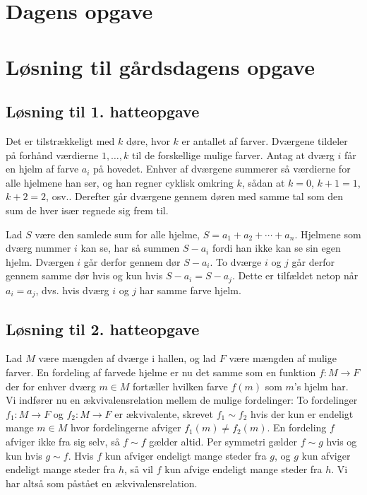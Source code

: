 \begin{minipage}[t]{100mm}
\vspace{3mm}
\section*{Dagens opgave}

\section*{Løsning til gårdsdagens opgave}
\subsection*{Løsning til 1. hatteopgave}
Det er tilstrækkeligt med $k$ døre, hvor $k$ er antallet af farver. Dværgene tildeler på forhånd værdierne $1,\dotsc,k$ til de forskellige mulige farver. Antag at dværg $i$ får en hjelm af farve $a_i$ på hovedet. Enhver af dværgene summerer så værdierne for alle hjelmene han ser, og han regner cyklisk omkring $k$, sådan at $k=0$, $k+1=1$, $k+2=2$, osv.. Derefter går dværgene gennem døren med samme tal som den sum de hver især regnede sig frem til.

Lad $S$ være den samlede sum for alle hjelme, $S=a_1+a_2+\dotsb+a_n$. Hjelmene som dværg nummer $i$ kan se, har så summen $S-a_i$ fordi han ikke kan se sin egen hjelm. Dværgen $i$ går derfor gennem dør $S-a_i$. To dværge $i$ og $j$ går derfor gennem samme dør hvis og kun hvis $S-a_i=S-a_j$. Dette er tilfældet netop når $a_i=a_j$, dvs. hvis dværg $i$ og $j$ har samme farve hjelm.

\subsection*{Løsning til 2. hatteopgave}
Lad $M$ være mængden af dværge i hallen, og lad $F$ være mængden af mulige farver. En fordeling af farvede hjelme er nu det samme som en funktion $f\colon M\to F$ der for enhver dværg $m\in M$ fortæller hvilken farve $f(m)$ som $m$'s hjelm har. Vi indfører nu en ækvivalensrelation mellem de mulige fordelinger: To fordelinger $f_1\colon M\to F$ og $f_2\colon M\to F$ er ækvivalente, skrevet $f_1\sim f_2$ hvis der kun er endeligt mange $m\in M$ hvor fordelingerne afviger $f_1(m)\neq f_2(m)$.
En fordeling $f$ afviger ikke fra sig selv, så $f\sim f$ gælder altid. Per symmetri gælder $f\sim g$ hvis og kun hvis $g\sim f$. Hvis $f$ kun afviger endeligt mange steder fra $g$, og $g$ kun afviger endeligt mange steder fra $h$, så vil $f$ kun afvige endeligt mange steder fra $h$. Vi har altså som påstået en ækvivalensrelation.


\end{minipage}
